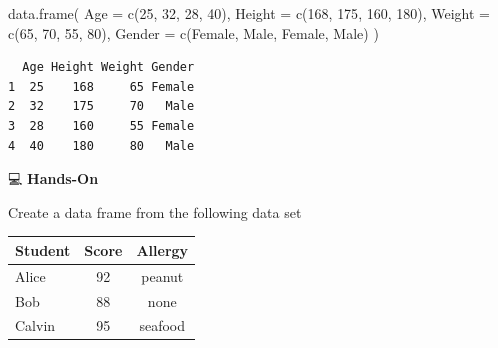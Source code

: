 \documentclass[
  letterpaper,
  DIV=11,
  numbers=noendperiod]{scrreprt}
\newenvironment{Shaded}{\begin{snugshade}}{\end{snugshade}}
\newcommand{\AttributeTok}[1]{\textcolor[rgb]{0.40,0.45,0.13}{#1}}
\newcommand{\DecValTok}[1]{\textcolor[rgb]{0.68,0.00,0.00}{#1}}
\newcommand{\FunctionTok}[1]{\textcolor[rgb]{0.28,0.35,0.67}{#1}}
\newcommand{\NormalTok}[1]{\textcolor[rgb]{0.00,0.23,0.31}{#1}}
\newcommand{\StringTok}[1]{\textcolor[rgb]{0.13,0.47,0.30}{#1}}
\begin{document}
\begin{Shaded}
\begin{Highlighting}[]
\FunctionTok{data.frame}\NormalTok{(}
  \AttributeTok{Age    =} \FunctionTok{c}\NormalTok{(}\DecValTok{25}\NormalTok{, }\DecValTok{32}\NormalTok{, }\DecValTok{28}\NormalTok{, }\DecValTok{40}\NormalTok{), }
  \AttributeTok{Height =} \FunctionTok{c}\NormalTok{(}\DecValTok{168}\NormalTok{, }\DecValTok{175}\NormalTok{, }\DecValTok{160}\NormalTok{, }\DecValTok{180}\NormalTok{), }
  \AttributeTok{Weight =} \FunctionTok{c}\NormalTok{(}\DecValTok{65}\NormalTok{, }\DecValTok{70}\NormalTok{, }\DecValTok{55}\NormalTok{, }\DecValTok{80}\NormalTok{), }
  \AttributeTok{Gender =} \FunctionTok{c}\NormalTok{(}\StringTok{\textquotesingle{}Female\textquotesingle{}}\NormalTok{, }\StringTok{\textquotesingle{}Male\textquotesingle{}}\NormalTok{, }\StringTok{\textquotesingle{}Female\textquotesingle{}}\NormalTok{, }\StringTok{\textquotesingle{}Male\textquotesingle{}}\NormalTok{)}
\NormalTok{)}
\end{Highlighting}
\end{Shaded}

\begin{verbatim}
  Age Height Weight Gender
1  25    168     65 Female
2  32    175     70   Male
3  28    160     55 Female
4  40    180     80   Male
\end{verbatim}

💻 \textbf{Hands-On}

Create a data frame from the following data set

\begin{longtable}[]{@{}lcc@{}}
\toprule\noalign{}
Student & Score & Allergy \\
\midrule\noalign{}
\endhead
\bottomrule\noalign{}
\endlastfoot
Alice & 92 & peanut \\
Bob & 88 & none \\
Calvin & 95 & seafood \\
\end{longtable}
\end{document}
